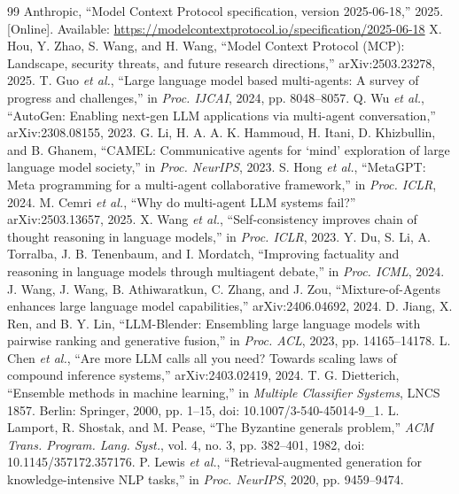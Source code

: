\begin{thebibliography}{99}
 Anthropic, ``Model Context Protocol specification, version 2025-06-18,'' 2025. [Online]. Available: \url{https://modelcontextprotocol.io/specification/2025-06-18}
 X. Hou, Y. Zhao, S. Wang, and H. Wang, ``Model Context Protocol (MCP): Landscape, security threats, and future research directions,'' arXiv:2503.23278, 2025.
 T. Guo \textit{et al.}, ``Large language model based multi-agents: A survey of progress and challenges,'' in \textit{Proc. IJCAI}, 2024, pp. 8048--8057.
 Q. Wu \textit{et al.}, ``AutoGen: Enabling next-gen LLM applications via multi-agent conversation,'' arXiv:2308.08155, 2023.
 G. Li, H. A. A. K. Hammoud, H. Itani, D. Khizbullin, and B. Ghanem, ``CAMEL: Communicative agents for `mind' exploration of large language model society,'' in \textit{Proc. NeurIPS}, 2023.
 S. Hong \textit{et al.}, ``MetaGPT: Meta programming for a multi-agent collaborative framework,'' in \textit{Proc. ICLR}, 2024.
 M. Cemri \textit{et al.}, ``Why do multi-agent LLM systems fail?'' arXiv:2503.13657, 2025.
 X. Wang \textit{et al.}, ``Self-consistency improves chain of thought reasoning in language models,'' in \textit{Proc. ICLR}, 2023.
 Y. Du, S. Li, A. Torralba, J. B. Tenenbaum, and I. Mordatch, ``Improving factuality and reasoning in language models through multiagent debate,'' in \textit{Proc. ICML}, 2024.
 J. Wang, J. Wang, B. Athiwaratkun, C. Zhang, and J. Zou, ``Mixture-of-Agents enhances large language model capabilities,'' arXiv:2406.04692, 2024.
 D. Jiang, X. Ren, and B. Y. Lin, ``LLM-Blender: Ensembling large language models with pairwise ranking and generative fusion,'' in \textit{Proc. ACL}, 2023, pp. 14165--14178.
 L. Chen \textit{et al.}, ``Are more LLM calls all you need? Towards scaling laws of compound inference systems,'' arXiv:2403.02419, 2024.
 T. G. Dietterich, ``Ensemble methods in machine learning,'' in \textit{Multiple Classifier Systems}, LNCS 1857. Berlin: Springer, 2000, pp. 1--15, doi: 10.1007/3-540-45014-9\_1.
 L. Lamport, R. Shostak, and M. Pease, ``The Byzantine generals problem,'' \textit{ACM Trans. Program. Lang. Syst.}, vol. 4, no. 3, pp. 382--401, 1982, doi: 10.1145/357172.357176.
 P. Lewis \textit{et al.}, ``Retrieval-augmented generation for knowledge-intensive NLP tasks,'' in \textit{Proc. NeurIPS}, 2020, pp. 9459--9474.

\end{thebibliography}

